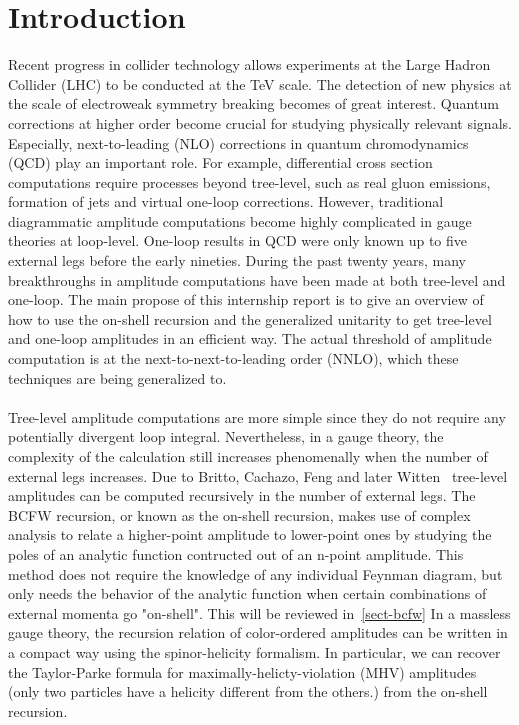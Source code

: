 \section{Introduction}
Recent progress in collider technology allows experiments at the Large Hadron Collider (LHC) to be conducted at the TeV scale.
The detection of new physics at the scale of electroweak symmetry breaking becomes of great interest. 
Quantum corrections at higher order become crucial for studying physically relevant signals. 
Especially, next-to-leading (NLO) corrections in quantum chromodynamics (QCD) play an important role. 
For example, differential cross section computations require processes beyond tree-level, such as real gluon emissions, formation of jets and virtual one-loop corrections.
However, traditional diagrammatic amplitude computations become highly complicated in gauge theories at loop-level.
One-loop results in QCD were only known up to five external legs before the early nineties. 
During the past twenty years, many breakthroughs in amplitude computations have been made at both tree-level and one-loop.
The main propose of this internship report is to give an overview of how to use the on-shell recursion and the generalized unitarity to get tree-level and one-loop amplitudes in an efficient way. 
The actual threshold of amplitude computation is at the next-to-next-to-leading order (NNLO), which these techniques are being generalized to.
\\\\
Tree-level amplitude computations are more simple since they do not require any potentially divergent loop integral.
Nevertheless, in a gauge theory, the complexity of the calculation still increases phenomenally when the number of external legs increases.
Due to Britto, Cachazo, Feng and later Witten~\cite{BRITTO2005499, PhysRevLett.94.181602}
tree-level amplitudes can be computed recursively in the number of external legs.
The BCFW recursion, or known as the on-shell recursion, makes use of complex analysis to relate a higher-point amplitude to lower-point ones by studying the poles of an analytic function contructed out of an n-point amplitude.
This method does not require the knowledge of any individual Feynman diagram, but only needs the behavior of the analytic function when certain combinations of external momenta go "on-shell". 
This will be reviewed in~\cref{sect-bcfw}
In a massless gauge theory, the recursion relation of color-ordered amplitudes can be written in a compact way using the spinor-helicity formalism.
In particular, we can recover the Taylor-Parke formula for maximally-helicty-violation (MHV) amplitudes (\ie only two particles have a helicity different from the others.) from the on-shell recursion.
